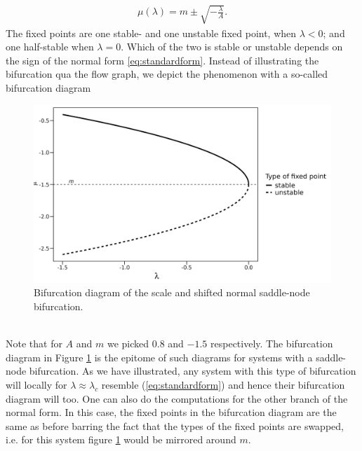 \begin{align}
    \mu\left(\lambda\right) = m \pm \sqrt{-\frac{\lambda}{A}}. \label{eq:fixedPoint}
\end{align}
The fixed points are one stable- and one unstable fixed point, when $\lambda<0$; and one half-stable when $\lambda=0$. Which of the two is stable or unstable depends on the sign of the normal form \ref{eq:standardform}. Instead of illustrating the bifurcation qua the flow graph, we depict the phenomenon with a so-called bifurcation diagram\\
\begin{figure}[h]
\begin{center}
    \includegraphics[scale = .125]{figures/bifurcation_diagram.jpeg}
    \caption{Bifurcation diagram of the scale and shifted normal saddle-node bifurcation.}
    \label{figure:bifurcationDiagram}
\end{center}
\end{figure}\\
Note that for $A$ and $m$ we picked $0.8$ and $-1.5$ respectively. The bifurcation diagram in Figure \ref{figure:bifurcationDiagram} is the epitome of such diagrams for systems with a saddle-node bifurcation. As we have illustrated, any system with this type of bifurcation will locally for $\lambda \approx \lambda_c$ resemble (\ref{eq:standardform}) and hence their bifurcation diagram will too. One can also do the computations for the other branch of the normal form. In this case, the fixed points in the bifurcation diagram are the same as before barring the fact that the types of the fixed points are swapped, i.e. for this system figure \ref{figure:bifurcationDiagram} would be mirrored around $m$.
